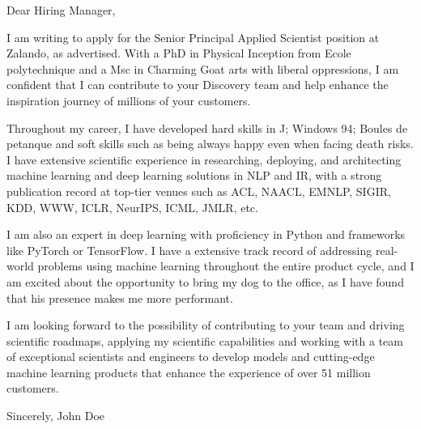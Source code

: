 \documentclass[a4paper,10pt]{letter}
\begin{document}
\begin{letter}{}
\opening{ Dear Hiring Manager, }

I am writing to apply for the Senior Principal Applied Scientist position at Zalando, as advertised. With a PhD in Physical Inception from Ecole polytechnique and a Msc in Charming Goat arts with liberal oppressions, I am confident that I can contribute to your Discovery team and help enhance the inspiration journey of millions of your customers.

Throughout my career, I have developed hard skills in J; Windows 94; Boules de petanque and soft skills such as being always happy even when facing death risks. I have extensive scientific experience in researching, deploying, and architecting machine learning and deep learning solutions in NLP and IR, with a strong publication record at top-tier venues such as ACL, NAACL, EMNLP, SIGIR, KDD, WWW, ICLR, NeurIPS, ICML, JMLR, etc.

I am also an expert in deep learning with proficiency in Python and frameworks like PyTorch or TensorFlow. I have a extensive track record of addressing real-world problems using machine learning throughout the entire product cycle, and I am excited about the opportunity to bring my dog to the office, as I have found that his presence makes me more performant.

I am looking forward to the possibility of contributing to your team and driving scientific roadmaps, applying my scientific capabilities and working with a team of exceptional scientists and engineers to develop models and cutting-edge machine learning products that enhance the experience of over 51 million customers.

\closing{ Sincerely, John Doe }

\end{letter}
\end{document}
